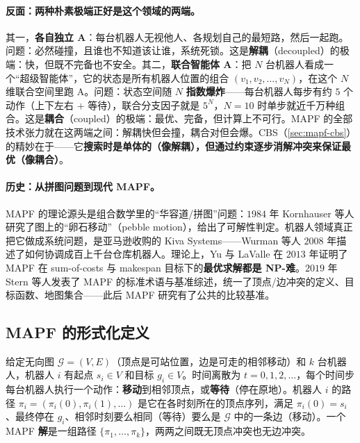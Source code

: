 \paragraph{反面：两种朴素极端正好是这个领域的两端。}
其一，\textbf{各自独立 A\*}：每台机器人无视他人、各规划自己的最短路，然后一起跑。问题：必然碰撞，且谁也不知道该让谁，系统死锁。这是\textbf{解耦}（decoupled）的极端：快，但既不完备也不安全。其二，\textbf{联合智能体 A\*}：把 $N$ 台机器人看成一个“超级智能体”，它的状态是所有机器人位置的组合 $(v_1,v_2,\dots,v_N)$，在这个 $N$ 维联合空间里跑 A\*。问题：状态空间随 $N$ \textbf{指数爆炸}——每台机器人每步有约 $5$ 个动作（上下左右 $+$ 等待），联合分支因子就是 $5^N$，$N=10$ 时单步就近千万种组合。这是\textbf{耦合}（coupled）的极端：最优、完备，但计算上不可行。MAPF 的全部技术张力就在这两端之间：解耦快但会撞，耦合对但会爆。CBS（\cref{sec:mapf-cbs}）的精妙在于——它\textbf{搜索时是单体的（像解耦），但通过约束逐步消解冲突来保证最优（像耦合）}。

\paragraph{历史：从拼图问题到现代 MAPF。}
MAPF 的理论源头是组合数学里的“华容道/拼图”问题：$1984$ 年 Kornhauser 等人研究了图上的“卵石移动”（pebble motion），给出了可解性判定\cite{kornhauser1984pebble}。机器人领域真正把它做成系统问题，是亚马逊收购的 Kiva Systems——Wurman 等人 $2008$ 年描述了如何协调成百上千台仓库机器人\cite{wurman2008coordinating}。理论上，Yu 与 LaValle 在 $2013$ 年证明了 MAPF 在 sum-of-costs 与 makespan 目标下的\textbf{最优求解都是 NP-难}\cite{yu2013structure}。$2019$ 年 Stern 等人发表了 MAPF 的标准术语与基准综述\cite{stern2019mapf}，统一了顶点/边冲突的定义、目标函数、地图集合——此后 MAPF 研究有了公共的比较基准。

\subsection{MAPF 的形式化定义}
\label{sec:mapf-def-formal}

\begin{definition}\label{def:mapf}
给定无向图 $\mathcal{G}=(V,E)$（顶点是可站位置，边是可走的相邻移动）和 $k$ 台机器人，机器人 $i$ 有起点 $s_i\in V$ 和目标 $g_i\in V$。时间离散为 $t=0,1,2,\dots$，每个时间步每台机器人执行一个动作：\textbf{移动}到相邻顶点，或\textbf{等待}（停在原地）。机器人 $i$ 的路径 $\pi_i=(\pi_i(0),\pi_i(1),\dots)$ 是它在各时刻所在的顶点序列，满足 $\pi_i(0)=s_i$、最终停在 $g_i$、相邻时刻要么相同（等待）要么是 $\mathcal{G}$ 中的一条边（移动）。一个 MAPF \textbf{解}是一组路径 $\{\pi_1,\dots,\pi_k\}$，两两之间既无顶点冲突也无边冲突。
\end{definition}

